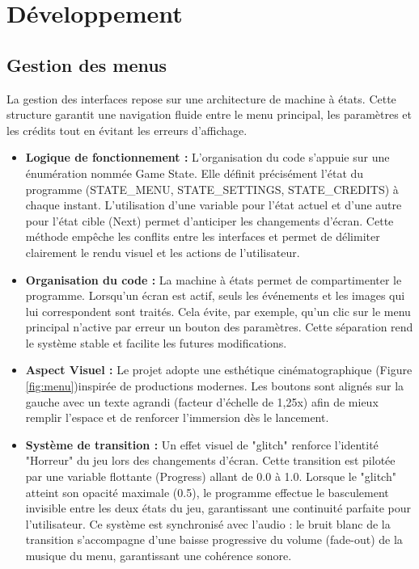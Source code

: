 \documentclass[11pt, a4paper]{article}
\begin{document}
\section{Développement}
\subsection{Gestion des menus}

La gestion des interfaces repose sur une architecture de machine à états. Cette structure garantit une navigation fluide entre le menu principal, les paramètres et les crédits tout en évitant les erreurs d'affichage. \\

\begin{itemize}
    \item \textbf{Logique de fonctionnement :} L'organisation du code s'appuie sur une énumération nommée Game State. Elle définit précisément l'état du programme (STATE\_MENU, STATE\_SETTINGS, STATE\_CREDITS) à chaque instant. L'utilisation d'une variable pour l'état actuel et d'une autre pour l'état cible (Next) permet d'anticiper les changements d'écran. Cette méthode empêche les conflits entre les interfaces et permet de délimiter clairement le rendu visuel et les actions de l'utilisateur. \\

    \item \textbf{Organisation du code :} La machine à états permet de compartimenter le programme. Lorsqu'un écran est actif, seuls les événements et les images qui lui correspondent sont traités. Cela évite, par exemple, qu'un clic sur le menu principal n'active par erreur un bouton des paramètres. Cette séparation rend le système stable et facilite les futures modifications. \\

    \item \textbf{Aspect Visuel :} Le projet adopte une esthétique cinématographique (Figure \ref{fig:menu})inspirée de productions modernes. Les boutons sont alignés sur la gauche avec un texte agrandi (facteur d'échelle de 1,25x) afin de mieux remplir l'espace et de renforcer l'immersion dès le lancement. \\

    \item \textbf{Système de transition :} Un effet visuel de "glitch" renforce l'identité "Horreur" du jeu lors des changements d'écran. Cette transition est pilotée par une variable flottante (Progress) allant de 0.0 à 1.0. Lorsque le "glitch" atteint son opacité maximale (0.5), le programme effectue le basculement invisible entre les deux états du jeu, garantissant une continuité parfaite pour l'utilisateur. Ce système est synchronisé avec l'audio : le bruit blanc de la transition s'accompagne d'une baisse progressive du volume (fade-out) de la musique du menu, garantissant une cohérence sonore. \\


\end{itemize}
\end{document}
